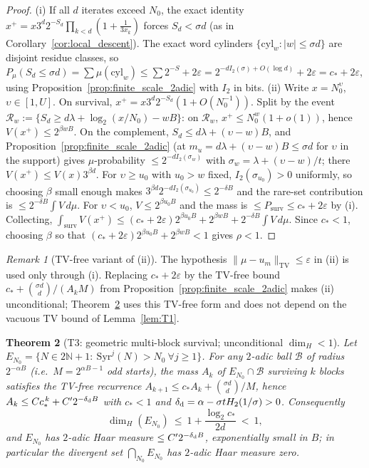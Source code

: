 \documentclass[12pt,a4paper]{article}
\newtheorem{theorem}{Theorem}[section]
\theoremstyle{remark}
\newtheorem{remark}[theorem]{Remark}
\begin{document}
\begin{proof}
(i) If all $d$ iterates exceed $N_0$, the exact identity
$x^+=x3^d2^{-S_d}\prod_{k<d}(1+\tfrac1{3x_k})$ forces
$S_d<\sigma d$ (as in Corollary~\ref{cor:local_descent}). The exact word
cylinders $\{\mathrm{cyl}_w:|w|\le\sigma d\}$ are disjoint residue classes, so
$P_\mu(S_d\le\sigma d)=\sum\mu(\mathrm{cyl}_w)\le\sum2^{-S}+2\varepsilon
=2^{-dI_2(\sigma)+O(\log d)}+2\varepsilon=c_*+2\varepsilon$,
using Proposition~\ref{prop:finite_scale_2adic} with $I_2$ in bits.
(ii) Write $x=N_0^{\upsilon}$, $\upsilon\in[1,U]$. On survival,
$x^+=x3^d2^{-S_d}(1+O(N_0^{-1}))$. Split by the event
$\mathcal R_w:=\{S_d\ge d\lambda+\log_2(x/N_0)-wB\}$: on $\mathcal R_w$,
$x^+\le N_0^{w}(1+o(1))$, hence $V(x^+)\le2^{\beta wB}$. On the complement,
$S_d\le d\lambda+(\upsilon-w)B$, and Proposition~\ref{prop:finite_scale_2adic}
(at $m_u=d\lambda+(\upsilon-w)B\le\sigma d$ for $\upsilon$ in the support) gives
$\mu$-probability $\le2^{-dI_2(\sigma_w)}$ with
$\sigma_w=\lambda+(\upsilon-w)/t$; there $V(x^+)\le V(x)3^{\beta d}$.
For $\upsilon\ge u_0$ with $u_0>w$ fixed, $I_2(\sigma_{u_0})>0$ uniformly, so
choosing $\beta$ small enough makes $3^{\beta d}2^{-dI_2(\sigma_{u_0})}\le2^{-\delta B}$
and the rare-set contribution is $\le2^{-\delta B}\int V\,d\mu$. For
$\upsilon<u_0$, $V\le2^{\beta u_0B}$ and the mass is $\le P_{\mathrm{surv}}\le c_*+2\varepsilon$
by (i). Collecting,
$\int_{\mathrm{surv}}V(x^+)\le(c_*+2\varepsilon)2^{\beta u_0B}+2^{\beta wB}+2^{-\delta B}\int V\,d\mu$.
Since $c_*<1$, choosing $\beta$ so that
$(c_*+2\varepsilon)2^{\beta u_0B}+2^{\beta wB}<1$ gives $\rho<1$.
\end{proof}
\begin{remark}[TV-free variant of (ii)]
\label{rem:T2_tvfree}
The hypothesis $\|\mu-
u_m\|_{\mathrm{TV}}\le\varepsilon$ in (ii) is used only
through (i). Replacing $c_*+2\varepsilon$ by the TV-free bound
$c_*+\binom{\sigma d}{d}/(A_kM)$ from Proposition~\ref{prop:finite_scale_2adic}
makes (ii) unconditional; Theorem~\ref{thm:T3} uses this TV-free form and does
not depend on the vacuous TV bound of Lemma~\ref{lem:T1}.
\end{remark}
\begin{theorem}[T3: geometric multi-block survival; unconditional $\dim_H<1$]
\label{thm:T3}
Let $E_{N_0}=\{N\in2\mathbb{N}+1:\ \mathrm{Syr}^j(N)>N_0\ \forall j\ge1\}$.
For any $2$-adic ball $\mathcal B$ of radius $2^{-\alpha B}$ (i.e.\
$M=2^{\alpha B-1}$ odd starts), the mass $A_k$ of $E_{N_0}\cap\mathcal B$
surviving $k$ blocks satisfies the TV-free recurrence
$A_{k+1}\le c_*A_k+\binom{\sigma d}{d}/M$, hence
$A_k\le C c_*^{\,k}+C'2^{-\delta_{\rm d}B}$ with $c_*<1$ and
$\delta_{\rm d}=\alpha-\sigma tH_2(1/\sigma)>0$.
Consequently
\[
\dim_H(E_{N_0})\ \le\ 1+\frac{\log_2 c_*}{2d}\ <\ 1,
\]
and $E_{N_0}$ has $2$-adic Haar measure $\le C'2^{-\delta_{\rm d}B}$,
exponentially small in $B$; in particular the divergent set
$\bigcap_{N_0}E_{N_0}$ has $2$-adic Haar measure zero.
\end{theorem}
\end{document}
